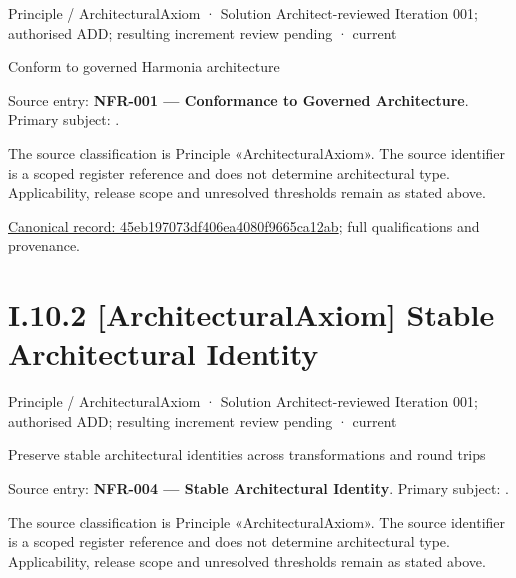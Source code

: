 \label{element:45eb197073df406ea4080f9665ca12ab}
{\small Principle / ArchitecturalAxiom · Solution Architect-reviewed Iteration 001; authorised ADD; resulting increment review pending · current}\par

Conform to governed Harmonia architecture



Source entry: \textbf{NFR-001 — Conformance to Governed Architecture}. Primary subject: \texttt{}.



The source classification is Principle «ArchitecturalAxiom». The source identifier is a scoped register reference and does not determine architectural type. Applicability, release scope and unresolved thresholds remain as stated above.


{\footnotesize \href{../../../../../../../../continuum/motivation/principle/architectural-axiom/45eb197073df406ea4080f9665ca12ab.md}{Canonical record: 45eb197073df406ea4080f9665ca12ab}; full qualifications and provenance.}\par
\section*{I.10.2 [ArchitecturalAxiom] Stable Architectural Identity}
\label{navigation:I.10.2}

\label{element:86ecebbf65fc46af9763c96840342823}
{\small Principle / ArchitecturalAxiom · Solution Architect-reviewed Iteration 001; authorised ADD; resulting increment review pending · current}\par

Preserve stable architectural identities across transformations and round trips



Source entry: \textbf{NFR-004 — Stable Architectural Identity}. Primary subject: \texttt{}.



The source classification is Principle «ArchitecturalAxiom». The source identifier is a scoped register reference and does not determine architectural type. Applicability, release scope and unresolved thresholds remain as stated above.


